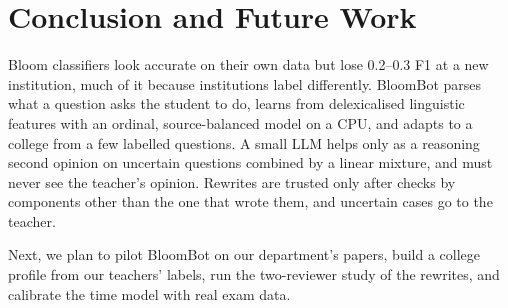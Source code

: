 \documentclass[conference]{IEEEtran}
\begin{document}
\section{Conclusion and Future Work}

Bloom classifiers look accurate on their own data but lose 0.2--0.3 F1 at a new institution,
much of it because institutions label differently. BloomBot parses what a question asks the
student to do, learns from delexicalised linguistic features with an ordinal, source-balanced
model on a CPU, and adapts to a college from a few labelled questions. A small LLM helps only as a
reasoning second opinion on uncertain questions combined by a linear mixture, and must never see
the teacher's opinion. Rewrites are trusted only after checks by components other than the one
that wrote them, and uncertain cases go to the teacher.

Next, we plan to pilot BloomBot on our department's papers, build a college profile from our
teachers' labels, run the two-reviewer study of the rewrites, and calibrate the time model with
real exam data.
\end{document}
